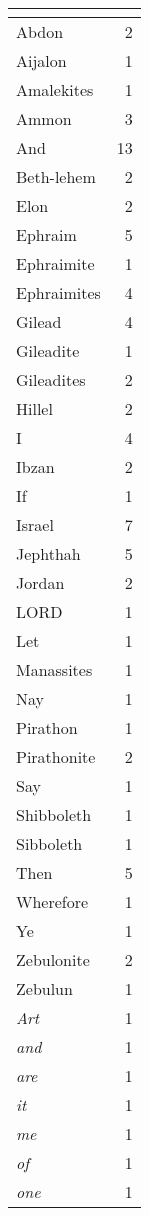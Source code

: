 \begin{center}
\begin{longtable}{l|r}
\hline \multicolumn{2}{c}{{ }} \\ \hline
\endfoot 
Abdon & 2\\ \hline 
Aijalon & 1\\ \hline 
Amalekites & 1\\ \hline 
Ammon & 3\\ \hline 
And & 13\\ \hline 
Beth-lehem & 2\\ \hline 
Elon & 2\\ \hline 
Ephraim & 5\\ \hline 
Ephraimite & 1\\ \hline 
Ephraimites & 4\\ \hline 
Gilead & 4\\ \hline 
Gileadite & 1\\ \hline 
Gileadites & 2\\ \hline 
Hillel & 2\\ \hline 
I & 4\\ \hline 
Ibzan & 2\\ \hline 
If & 1\\ \hline 
Israel & 7\\ \hline 
Jephthah & 5\\ \hline 
Jordan & 2\\ \hline 
LORD & 1\\ \hline 
Let & 1\\ \hline 
Manassites & 1\\ \hline 
Nay & 1\\ \hline 
Pirathon & 1\\ \hline 
Pirathonite & 2\\ \hline 
Say & 1\\ \hline 
Shibboleth & 1\\ \hline 
Sibboleth & 1\\ \hline 
Then & 5\\ \hline 
Wherefore & 1\\ \hline 
Ye & 1\\ \hline 
Zebulonite & 2\\ \hline 
Zebulun & 1\\ \hline 
\emph{Art} & 1\\ \hline 
\emph{and} & 1\\ \hline 
\emph{are} & 1\\ \hline 
\emph{it} & 1\\ \hline 
\emph{me} & 1\\ \hline 
\emph{of} & 1\\ \hline 
\emph{one} & 1\\ \hline 

\end{longtable}
\end{center}
